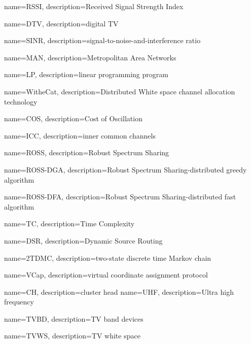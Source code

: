 {
    name=RSSI,
    description={Received Signal Strength Index}
}


{
    name=DTV,
    description={digital TV}
}

{
    name=SINR,
    description={signal-to-noise-and-interference ratio}
}

{
    name=MAN,
    description={Metropolitan Area Networks}
}

{
    name=LP,
    description={linear programming program}
}

{
    name=WitheCat,
    description={Distributed White space channel allocation technology}
}

{
    name=COS,
    description={Cost of Oscillation}
}

{
    name=ICC,
    description={inner common channels}
}

{
    name=ROSS,
    description={Robust Spectrum Sharing}
}

{
    name=ROSS-DGA,
    description={Robust Spectrum Sharing-distributed greedy algorithm}
}

{
    name=ROSS-DFA,
    description={Robust Spectrum Sharing-distributed fast algorithm}
}


{
    name=TC,
    description={Time Complexity}
}

{
    name=DSR,
    description={Dynamic Source Routing}
}

{
    name=2TDMC,
    description={two-state discrete time Markov chain}
}

{
    name=VCap,
    description={virtual coordinate assignment protocol}
}


{
    name=CH,
    description={cluster head}
}
{
    name=UHF,
    description={Ultra high frequency}
}


{
    name=TVBD,
    description={TV band devices}
}

{
    name=TVWS,
    description={TV white space}
}